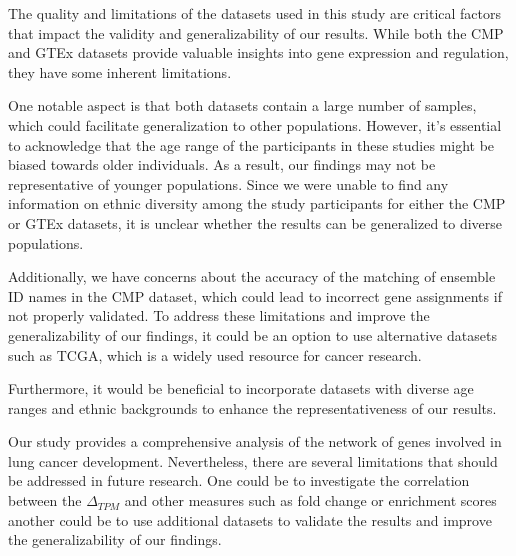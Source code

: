 The quality and limitations of the datasets used in this study are critical factors that impact the validity and generalizability of our results.
While both the CMP and GTEx datasets provide valuable insights into gene expression and regulation,
they have some inherent limitations.

One notable aspect is that both datasets contain a large number of samples,
which could facilitate generalization to other populations.
However, it's essential to acknowledge that the age range of the participants in these studies might be biased towards older individuals.
As a result, our findings may not be representative of younger populations.
Since we were unable to find any information on ethnic diversity among the study participants for either the CMP or GTEx datasets,
it is unclear whether the results can be generalized to diverse populations.

Additionally, we have concerns about the accuracy of the matching of ensemble ID names in the CMP dataset,
which could lead to incorrect gene assignments if not properly validated.
To address these limitations and improve the generalizability of our findings,
it could be an option to use alternative datasets such as TCGA, which is a widely used resource for cancer research.

Furthermore, it would be beneficial to incorporate datasets with diverse age ranges
and ethnic backgrounds to enhance the representativeness of our results.


Our study provides a comprehensive analysis of the network of genes involved in lung cancer development.
Nevertheless, there are several limitations that should be addressed in future research.
One could be to investigate the correlation between the $\Delta_{TPM}$ and other measures such as fold change or enrichment scores
another could be to use additional datasets to validate the results and improve the generalizability of our findings.
